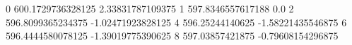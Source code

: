 0 600.1729736328125 2.33831787109375
1 597.8346557617188 0.0
2 596.8099365234375 -1.02471923828125
4 596.25244140625 -1.58221435546875
6 596.4444580078125 -1.39019775390625
8 597.03857421875 -0.79608154296875
